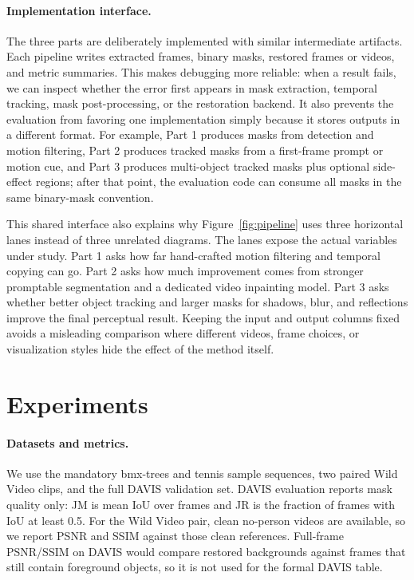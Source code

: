 \documentclass[10pt,twocolumn,letterpaper]{article}
\begin{document}
\paragraph{Implementation interface.}
The three parts are deliberately implemented with similar intermediate artifacts. Each pipeline writes extracted frames, binary masks, restored frames or videos, and metric summaries. This makes debugging more reliable: when a result fails, we can inspect whether the error first appears in mask extraction, temporal tracking, mask post-processing, or the restoration backend. It also prevents the evaluation from favoring one implementation simply because it stores outputs in a different format. For example, Part 1 produces masks from detection and motion filtering, Part 2 produces tracked masks from a first-frame prompt or motion cue, and Part 3 produces multi-object tracked masks plus optional side-effect regions; after that point, the evaluation code can consume all masks in the same binary-mask convention.

This shared interface also explains why Figure~\ref{fig:pipeline} uses three horizontal lanes instead of three unrelated diagrams. The lanes expose the actual variables under study. Part 1 asks how far hand-crafted motion filtering and temporal copying can go. Part 2 asks how much improvement comes from stronger promptable segmentation and a dedicated video inpainting model. Part 3 asks whether better object tracking and larger masks for shadows, blur, and reflections improve the final perceptual result. Keeping the input and output columns fixed avoids a misleading comparison where different videos, frame choices, or visualization styles hide the effect of the method itself.

\section{Experiments}
\paragraph{Datasets and metrics.}
We use the mandatory bmx-trees and tennis sample sequences, two paired Wild Video clips, and the full DAVIS validation set. DAVIS evaluation reports mask quality only: JM is mean IoU over frames and JR is the fraction of frames with IoU at least 0.5. For the Wild Video pair, clean no-person videos are available, so we report PSNR and SSIM against those clean references. Full-frame PSNR/SSIM on DAVIS would compare restored backgrounds against frames that still contain foreground objects, so it is not used for the formal DAVIS table.
\end{document}
